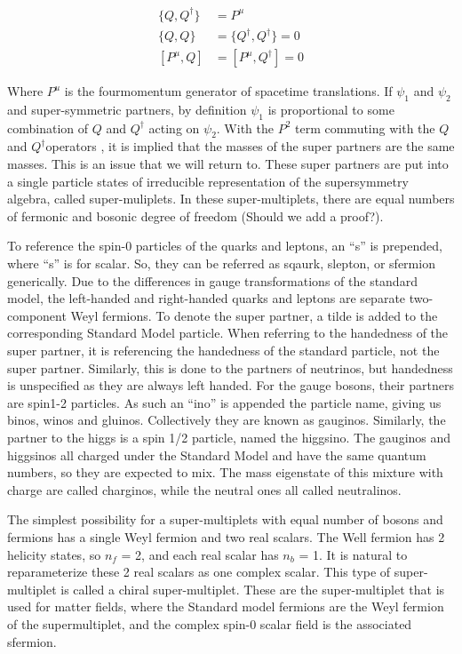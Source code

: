 \begin{align*}
    \{Q,Q^{\dagger}\} &= P^{\mu} \\
    \{Q,Q\} &= \{Q^{\dagger},Q^{\dagger}\} = 0 \\
    [P^{\mu},Q] &= [P^{\mu},Q^{\dagger}] = 0
\end{align*}

Where $P^u$ is the fourmomentum generator of spacetime translations. If $\psi_1$ and $\psi_2$ and super-symmetric partners, by definition $\psi_1$ is proportional to some combination of $Q$ and $Q^{\dagger}$ acting on $\psi_2$. With the $P^2$ term commuting with the $Q$ and $Q^{\dagger}$operators , it is implied that the masses of the super partners are the same masses. This is an issue that we will return to. These super partners are put into a single particle states of irreducible representation of the supersymmetry algebra, called super-muliplets. In these super-multiplets, there are equal numbers of fermonic and bosonic degree of freedom (Should we add a proof?).


To reference the spin-0 particles of the quarks and leptons, an “s” is prepended, where “s” is for scalar. So, they can be referred as sqaurk, slepton, or sfermion generically. Due to the differences in gauge transformations of the standard model, the left-handed and right-handed quarks and leptons are separate two-component Weyl fermions. To denote the super partner, a tilde is added to the corresponding Standard Model particle. When referring to the handedness of the super partner, it is referencing the handedness of the standard particle, not the super partner. Similarly, this is done to the partners of neutrinos, but handedness is unspecified as they are always left handed. For the gauge bosons, their partners are spin1-2 particles. As such an “ino” is appended the particle name, giving us binos, winos and gluinos. Collectively they are known as gauginos. Similarly, the partner to the higgs is a spin 1/2 particle, named the higgsino. The gauginos and higgsinos all charged under the Standard Model and have the same quantum numbers, so they are expected to mix. The mass eigenstate of this mixture with charge are called charginos, while the neutral ones all called neutralinos.  



The simplest possibility for a super-multiplets with equal number of bosons and fermions has a single Weyl fermion and two real scalars. The Well fermion has 2 helicity states, so $n_f$ = 2, and each real scalar has $n_b$ = 1. It is natural to reparameterize these 2 real scalars as one complex scalar. This type of super-multiplet is called a chiral super-multiplet. These are the super-multiplet that is used for matter fields, where the Standard model fermions are the Weyl fermion of the supermultiplet, and the complex spin-0 scalar field is the associated sfermion. 

